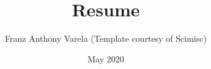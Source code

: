 \documentclass{article}
\title{Resume}
\author{Franz Anthony Varela (Template courtesy of Scimisc)}
\date{May 2020}
\begin{document}

\makecvtitle %


\end{document}
